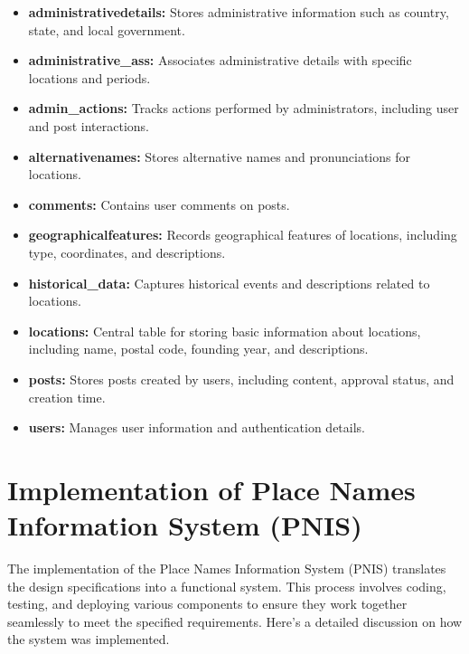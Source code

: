 \begin{itemize}
    \item \textbf{administrativedetails:} Stores administrative information such as country, state, and local government.
    \item \textbf{administrative\_ass:} Associates administrative details with specific locations and periods.
    \item \textbf{admin\_actions:} Tracks actions performed by administrators, including user and post interactions.
    \item \textbf{alternativenames:} Stores alternative names and pronunciations for locations.
    \item \textbf{comments:} Contains user comments on posts.
    \item \textbf{geographicalfeatures:} Records geographical features of locations, including type, coordinates, and descriptions.
    \item \textbf{historical\_data:} Captures historical events and descriptions related to locations.
    \item \textbf{locations:} Central table for storing basic information about locations, including name, postal code, founding year, and descriptions.
    \item \textbf{posts:} Stores posts created by users, including content, approval status, and creation time.
    \item \textbf{users:} Manages user information and authentication details.
\end{itemize}

\section{Implementation of Place Names Information System (PNIS)}
The implementation of the Place Names Information System (PNIS) translates the design specifications into a functional system. This process involves coding, testing, and deploying various components to ensure they work together seamlessly to meet the specified requirements. Here’s a detailed discussion on how the system was implemented.

